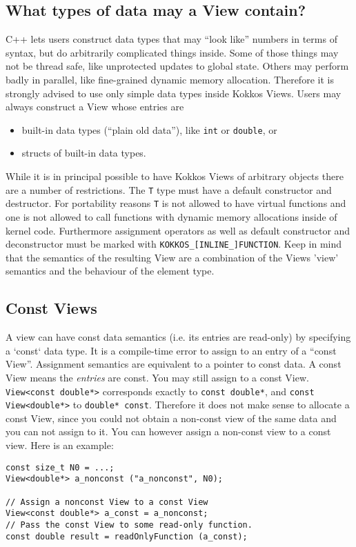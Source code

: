 \subsection{What types of data may a View contain?}

C++ lets users construct data types that may ``look like'' numbers in
terms of syntax, but do arbitrarily complicated things inside.  Some
of those things may not be thread safe, like unprotected updates to
global state.  Others may perform badly in parallel, like fine-grained
dynamic memory allocation.  Therefore it is strongly advised to use 
only simple data types inside Kokkos Views.
Users may always construct a View whose entries are 
\begin{itemize}
\item built-in data types (``plain old data''), like \texttt{int} or
  \texttt{double}, or
\item structs of built-in data types.
\end{itemize}

While it is in principal possible to have Kokkos Views of arbitrary 
objects there are a number of restrictions. The \lstinline|T| type 
must have a default constructor and destructor. For portability reasons
\lstinline|T| is not allowed to have virtual functions and one is not 
allowed to call functions with dynamic memory allocations inside of 
kernel code. Furthermore assignment operators as well as default constructor
and deconstructor must be marked with \lstinline|KOKKOS_[INLINE_]FUNCTION|. 
Keep in mind that the semantics of the resulting View are a combination of the 
Views 'view' semantics and the behaviour of the element type.

\subsection{Const Views}

A view can have const data semantics (i.e. its entries are read-only) by 
specifying a `const` data type.  It is a compile-time error to assign to an 
entry of a ``const View''.  Assignment semantics are equivalent to a pointer to 
const data.  
A const View means the \emph{entries} are const.  You
may still assign to a const View.  \lstinline!View<const double*>!
corresponds exactly to \lstinline!const double*!, and
\lstinline!const View<double*>! to \lstinline!double* const!.
Therefore it does not make sense to allocate a const View,
since you could not obtain a non-const view of the same data and you 
can not assign to it. You can however assign a non-const view to a const
view.  Here is an example:
\begin{lstlisting}
const size_t N0 = ...;
View<double*> a_nonconst ("a_nonconst", N0);

// Assign a nonconst View to a const View
View<const double*> a_const = a_nonconst;
// Pass the const View to some read-only function.
const double result = readOnlyFunction (a_const);
\end{lstlisting}

